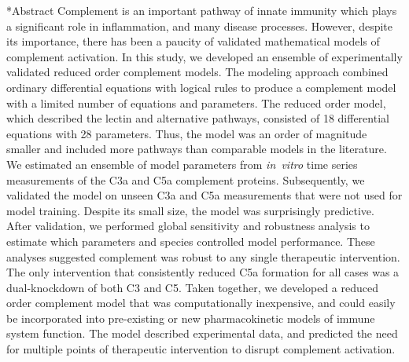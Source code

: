 \documentclass[12pt]{article}
\makeatletter
\renewcommand\section{\@startsection
	{subsection}{2}{0mm}
	{-0.2in}
	{0.05\baselineskip}
	{\normalfont\large\bfseries}}
\makeatother
\begin{document}
\section*{Abstract}
Complement is an important pathway of innate immunity which plays a significant role in inflammation, and many disease processes.
However, despite its importance, there has been a paucity of validated mathematical models of complement activation.
In this study, we developed an ensemble of experimentally validated reduced order complement models.
The modeling approach combined ordinary differential equations with logical rules to produce a complement model with a limited number of equations and parameters.
The reduced order model,  which described the lectin and alternative pathways, consisted of 18 differential equations with 28 parameters.
Thus, the model was an order of magnitude smaller and included more pathways than comparable models in the literature.
We estimated an ensemble of model parameters from \textit{in~vitro} time series measurements of the C3a and C5a complement proteins.
Subsequently, we validated the model on unseen C3a and C5a measurements that were not used for model training.
Despite its small size, the model was surprisingly predictive.
After validation, we performed global sensitivity and robustness analysis to estimate which parameters and species
controlled model performance. These analyses suggested complement was robust to any single therapeutic intervention.
The only intervention that consistently reduced C5a formation for all cases was a dual-knockdown of both C3 and C5.
Taken together, we developed a reduced order complement model that was computationally inexpensive,
and could easily be incorporated into pre-existing or new pharmacokinetic models of immune system function.
The model described experimental data, and predicted the need for multiple points of therapeutic intervention to disrupt complement activation.
\end{document}
